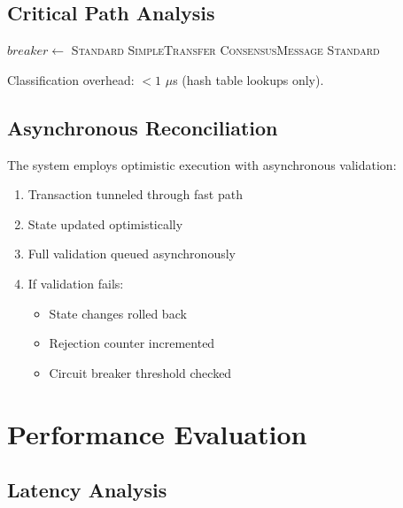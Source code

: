 \documentclass[11pt,a4paper]{article}
\begin{document}
\subsection{Critical Path Analysis}

\begin{algorithm}
\caption{Transaction Classification}
\begin{algorithmic}[1]
    \State $breaker \gets$ 
        \State \Return \textsc{Standard}
    \EndIf
        \State \Return \textsc{SimpleTransfer}
    \EndIf
        \State \Return \textsc{ConsensusMessage}
    \EndIf
    \State \Return \textsc{Standard}
\EndProcedure
\end{algorithmic}
\end{algorithm}

Classification overhead: $<1$ $\mu$s (hash table lookups only).

\subsection{Asynchronous Reconciliation}

The system employs optimistic execution with asynchronous validation:

\begin{enumerate}
    \item Transaction tunneled through fast path
    \item State updated optimistically
    \item Full validation queued asynchronously
    \item If validation fails:
    \begin{itemize}
        \item State changes rolled back
        \item Rejection counter incremented
        \item Circuit breaker threshold checked
    \end{itemize}
\end{enumerate}

\section{Performance Evaluation}

\subsection{Latency Analysis}
\end{document}
